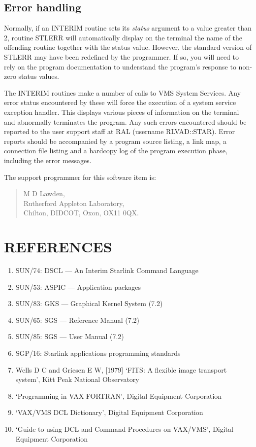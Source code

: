 \documentclass{article}
\begin{document}
\subsection {Error handling}
Normally, if an INTERIM routine sets its {\em status} argument to a value greater
than 2, routine STLERR will automatically display on the terminal the name
of the offending routine together with the status value.
However, the standard version of STLERR may have been redefined by the
programmer.
If so, you will need to rely on the program documentation to understand the
program's response to non-zero status values.

The INTERIM routines make a number of calls to VMS System Services.
Any error status encountered by these will force the execution of a system
service exception handler.
This displays various pieces of information on the terminal and abnormally
terminates the program.
Any such errors encountered should be reported to the user support staff at
RAL (username RLVAD::STAR).
Error reports should be accompanied by a program source listing, a link map, a
connection file listing and a hardcopy log of the program execution phase,
including the  error messages.

The support programmer for this software item is:
\begin{quote}
M D Lawden,\\
Rutherford Appleton Laboratory,\\
Chilton, DIDCOT, Oxon, OX11 0QX.
\end{quote}
\section {REFERENCES}
\begin{enumerate}
\item SUN/74: DSCL --- An Interim Starlink Command Language
\item SUN/53: ASPIC --- Application packages
\item SUN/83: GKS --- Graphical Kernel System (7.2)
\item SUN/65: SGS --- Reference Manual (7.2)
\item SUN/85: SGS --- User Manual (7.2)
\item SGP/16: Starlink applications programming standards
\item Wells D C and Griesen E W,  [1979] `FITS: A flexible image
transport system', Kitt Peak National Observatory
\item `Programming in VAX FORTRAN', Digital Equipment Corporation
\item `VAX/VMS DCL Dictionary', Digital Equipment Corporation
\item `Guide to using DCL and Command Procedures on VAX/VMS',
Digital Equipment Corporation
\end{enumerate}
\appendix
\end{document}
